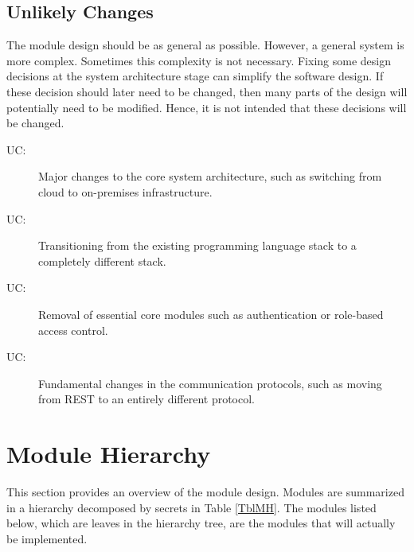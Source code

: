 \documentclass[12pt, titlepage]{article}
\newcounter{ucnum}
\newcommand{\uctheucnum}{UC\theucnum}
\begin{document}

\subsection{Unlikely Changes} \label{SecUchange}

The module design should be as general as possible. However, a general system is
more complex. Sometimes this complexity is not necessary. Fixing some design
decisions at the system architecture stage can simplify the software design. If
these decision should later need to be changed, then many parts of the design
will potentially need to be modified. Hence, it is not intended that these
decisions will be changed.

\begin{description}
\item[ \uctheucnum \label{ucArchitecture}:] Major changes to the core system architecture, such as switching from cloud to on-premises infrastructure.
\item[ \uctheucnum \label{ucLanguages}:] Transitioning from the existing programming language stack to a completely different stack.
\item[ \uctheucnum \label{ucCoreModules}:] Removal of essential core modules such as authentication or role-based access control.
\item[ \uctheucnum \label{ucProtocols}:] Fundamental changes in the communication protocols, such as moving from REST to an entirely different protocol.
\end{description}

\section{Module Hierarchy} \label{SecMH}

This section provides an overview of the module design. Modules are summarized
in a hierarchy decomposed by secrets in Table \ref{TblMH}. The modules listed
below, which are leaves in the hierarchy tree, are the modules that will
actually be implemented.
\end{document}
